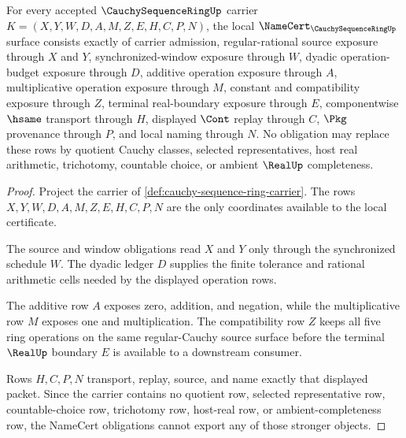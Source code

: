 \begin{theorem}
\label{thm:cauchy-sequence-ring-namecert-obligations}
For every accepted $\CauchySequenceRingUp$ carrier $K=(X,Y,W,D,A,M,Z,E,H,C,P,N)$, the local $\NameCert_{\CauchySequenceRingUp}$ surface consists exactly of carrier admission, regular-rational source exposure through $X$ and $Y$, synchronized-window exposure through $W$, dyadic operation-budget exposure through $D$, additive operation exposure through $A$, multiplicative operation exposure through $M$, constant and compatibility exposure through $Z$, terminal real-boundary exposure through $E$, componentwise $\hsame$ transport through $H$, displayed $\Cont$ replay through $C$, $\Pkg$ provenance through $P$, and local naming through $N$. No obligation may replace these rows by quotient Cauchy classes, selected representatives, host real arithmetic, trichotomy, countable choice, or ambient $\RealUp$ completeness.
\end{theorem}
\begin{proof}
Project the carrier of \autoref{def:cauchy-sequence-ring-carrier}. The rows $X,Y,W,D,A,M,Z,E,H,C,P,N$ are the only coordinates available to the local certificate.

The source and window obligations read $X$ and $Y$ only through the synchronized schedule $W$. The dyadic ledger $D$ supplies the finite tolerance and rational arithmetic cells needed by the displayed operation rows.

The additive row $A$ exposes zero, addition, and negation, while the multiplicative row $M$ exposes one and multiplication. The compatibility row $Z$ keeps all five ring operations on the same regular-Cauchy source surface before the terminal $\RealUp$ boundary $E$ is available to a downstream consumer.

Rows $H,C,P,N$ transport, replay, source, and name exactly that displayed packet. Since the carrier contains no quotient row, selected representative row, countable-choice row, trichotomy row, host-real row, or ambient-completeness row, the NameCert obligations cannot export any of those stronger objects.
\end{proof}

